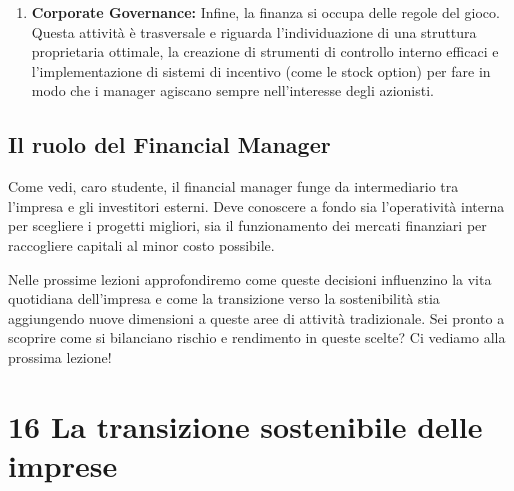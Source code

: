 \documentclass[a4paper,10pt]{article}
\begin{document}
\begin{enumerate}
    \item \textbf{Corporate Governance:} Infine, la finanza si occupa delle regole del gioco. Questa attività è trasversale e riguarda l'individuazione di una struttura proprietaria ottimale, la creazione di strumenti di controllo interno efficaci e l'implementazione di sistemi di incentivo (come le stock option) per fare in modo che i manager agiscano sempre nell'interesse degli azionisti.
\end{enumerate}

\subsection*{Il ruolo del Financial Manager}

Come vedi, caro studente, il financial manager funge da intermediario tra l'impresa e gli investitori esterni. Deve conoscere a fondo sia l'operatività interna per scegliere i progetti migliori, sia il funzionamento dei mercati finanziari per raccogliere capitali al minor costo possibile.

Nelle prossime lezioni approfondiremo come queste decisioni influenzino la vita quotidiana dell'impresa e come la transizione verso la sostenibilità stia aggiungendo nuove dimensioni a queste aree di attività tradizionale. Sei pronto a scoprire come si bilanciano rischio e rendimento in queste scelte? Ci vediamo alla prossima lezione!

\section*{16 La transizione sostenibile delle imprese}
\end{document}
